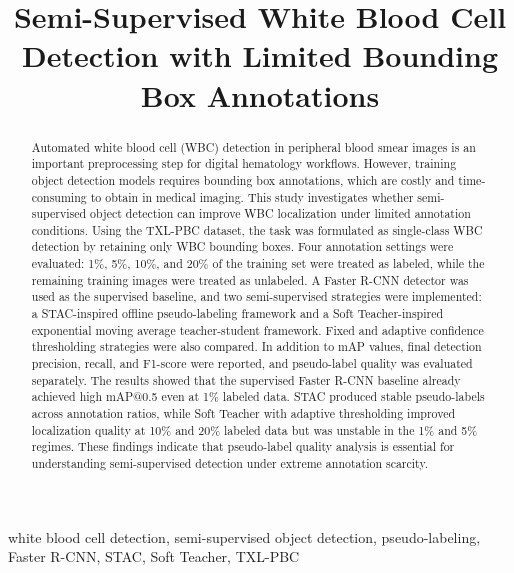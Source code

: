 \documentclass[conference,a4paper]{IEEEtran}
\begin{document}
\title{Semi-Supervised White Blood Cell Detection with Limited Bounding Box Annotations}

\author{
}

\maketitle

\begin{abstract}
Automated white blood cell (WBC) detection in peripheral blood smear images is an important preprocessing step for digital hematology workflows. However, training object detection models requires bounding box annotations, which are costly and time-consuming to obtain in medical imaging. This study investigates whether semi-supervised object detection can improve WBC localization under limited annotation conditions. Using the TXL-PBC dataset, the task was formulated as single-class WBC detection by retaining only WBC bounding boxes. Four annotation settings were evaluated: 1\%, 5\%, 10\%, and 20\% of the training set were treated as labeled, while the remaining training images were treated as unlabeled. A Faster R-CNN detector was used as the supervised baseline, and two semi-supervised strategies were implemented: a STAC-inspired offline pseudo-labeling framework and a Soft Teacher-inspired exponential moving average teacher-student framework. Fixed and adaptive confidence thresholding strategies were also compared. In addition to mAP values, final detection precision, recall, and F1-score were reported, and pseudo-label quality was evaluated separately. The results showed that the supervised Faster R-CNN baseline already achieved high mAP@0.5 even at 1\% labeled data. STAC produced stable pseudo-labels across annotation ratios, while Soft Teacher with adaptive thresholding improved localization quality at 10\% and 20\% labeled data but was unstable in the 1\% and 5\% regimes. These findings indicate that pseudo-label quality analysis is essential for understanding semi-supervised detection under extreme annotation scarcity.
\end{abstract}

\begin{IEEEkeywords}
white blood cell detection, semi-supervised object detection, pseudo-labeling, Faster R-CNN, STAC, Soft Teacher, TXL-PBC
\end{IEEEkeywords}
\end{document}
